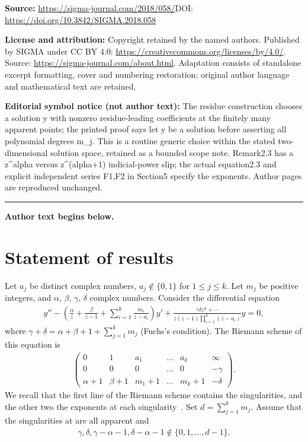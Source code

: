 \documentclass[11pt]{article}
\numberwithin{equation}{section}
\def\lc{,\allowbreak\ldots,\allowbreak}
\begin{document}
\noindent\textbf{Source:} \url{https://sigma-journal.com/2018/058/}\quad DOI: \url{https://doi.org/10.3842/SIGMA.2018.058}\par
\noindent\textbf{License and attribution:} Copyright retained by the named authors. Published by SIGMA under CC BY 4.0: \url{https://creativecommons.org/licenses/by/4.0/}. Source: \url{https://sigma-journal.com/about.html}. Adaptation consists of standalone excerpt formatting, cover and numbering restoration; original author language and mathematical text are retained.\par
\noindent\textbf{Editorial symbol notice (not author text):} The residue construction chooses a solution y with nonzero residue-leading coefficients at the finitely many apparent points; the printed proof says let y be a solution before asserting all polynomial degrees m\_j. This is a routine generic choice within the stated two-dimensional solution space, retained as a bounded scope note. Remark2.3 has a z\textasciicircum{}alpha versus z\textasciicircum{}(alpha+1) indicial-power slip; the actual equation2.3 and explicit independent series F1,F2 in Section5 specify the exponents. Author pages are reproduced unchanged.\par
\medskip\hrule\medskip\noindent\textbf{Author text begins below.}\par
\setcounter{section}{1}
\setcounter{subsection}{0}
\setcounter{subsubsection}{0}
\setcounter{thm}{0}
\setcounter{equation}{1}
\section{Statement of results}\label{section2}

Let $a_j$ be distinct complex numbers, $a_j\not\in\{0,1\}$ for $1\leq j\leq k$. Let $m_j$ be positive integers, and $\alpha$, $\beta$, $\gamma$, $\delta$ complex numbers. Consider the differential equation
\begin{gather}\label{1a}
y''-\left( \frac\alpha z+\frac\beta{z-1}+\sum_{i=1}^k \frac{m_i}{z-a_i}\right) y'+\frac{\gamma\delta z^k+\cdots{}}{z(z-1)\prod\limits_{i=1}^k(z-a_i)}y = 0,
\end{gather}
where $\gamma+\delta=\alpha+\beta+1+\sum\limits_{j=1}^km_j$ (Fuchs's condition). The Riemann scheme of this equation is
\begin{gather*}
\left(\begin{matrix}
0&1&a_1&\ldots&a_k&\infty\\
0&0&0&\ldots&0&-\gamma\\
\alpha+1&\beta+1&m_1+1&\ldots&m_k+1&-\delta
\end{matrix}\right).
\end{gather*}
We recall that the first line of the Riemann scheme contains the singularities, and the other two the exponents at each singularity~\cite{Mellin}. Set $d=\sum\limits_{j=1}^km_j$. Assume that the singularities at \smash{$a_1\lc a_k$} are all apparent and
\begin{gather}\label{0d}
\gamma, \delta, \gamma-\alpha-1, \delta-\alpha-1 \not\in \{0,1\lc d-1\}.
\end{gather}
\end{document}
